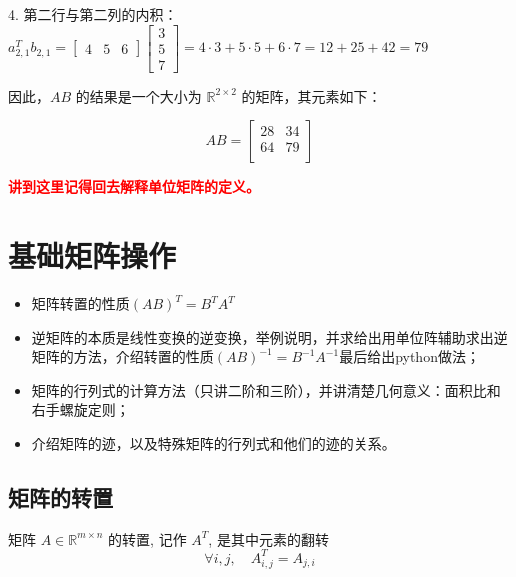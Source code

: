 \begin{exercise}
4. 第二行与第二列的内积： $a_{2,1}^T b_{2,1} = \begin{bmatrix} 4 & 5 & 6 \end{bmatrix} \begin{bmatrix} 3 \\ 5 \\ 7 \end{bmatrix} = 4 \cdot 3 + 5 \cdot 5 + 6 \cdot 7 = 12 + 25 + 42 = 79$

因此，$AB$ 的结果是一个大小为 $\mathbb{R}^{2 \times 2}$ 的矩阵，其元素如下：

\[
AB = \begin{bmatrix}
28 & 34 \\
64 & 79 \\
\end{bmatrix}
\]

\end{exercise}

\textcolor{red}{\bf 讲到这里记得回去解释单位矩阵的定义。}


\section{基础矩阵操作}

\begin{proposition}[TODO]

\begin{itemize}
    \item  矩阵转置的性质$(AB)^{T}=B^{T} A^{T}$
    \item 逆矩阵的本质是线性变换的逆变换，举例说明，并求给出用单位阵辅助求出逆矩阵的方法，介绍转置的性质$(AB)^{-1}=B^{-1} A^{-1}$最后给出python做法；
    \item 矩阵的行列式的计算方法（只讲二阶和三阶），并讲清楚几何意义：面积比和右手螺旋定则；
    \item 介绍矩阵的迹，以及特殊矩阵的行列式和他们的迹的关系。
\end{itemize}

\end{proposition}

\subsection{矩阵的转置}

\begin{definition}
    
矩阵 $A \in \mathbb{R}^{m \times n}$ 的转置, 记作 $A^T$, 是其中元素的翻转
$$
\forall i, j, \quad A_{i, j}^T=A_{j, i}
$$
\end{definition}

